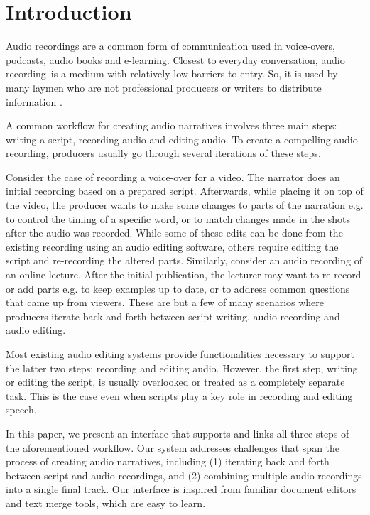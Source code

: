 \section{Introduction}
Audio recordings are a common form of communication used in voice-overs, podcasts, audio books and e-learning. Closest to everyday conversation, audio recording\ is a medium with relatively low barriers to entry. So, it is used by many laymen who are not professional producers or writers to distribute information .

A common workflow for creating audio narratives involves three main steps: writing a script, recording audio and editing audio. To create a compelling audio recording, producers usually go through several iterations of these steps.  

Consider the case of recording a voice-over for a video. The narrator does an initial recording based on a prepared script. Afterwards, while placing it on top of the video, the producer wants to make some changes to parts of the narration e.g. to control the timing of a specific word, or to match changes made in the shots after the audio was recorded. While some of these edits can be done from the existing recording using an audio editing software, others require editing the script and re-recording the altered parts. Similarly, consider an audio recording of an online lecture. After the initial publication, the lecturer may want to re-record or add parts e.g. to keep examples up to date, or to address common questions that came up from viewers. These are but a few of many scenarios where producers iterate back and forth between script writing, audio recording and audio editing.

Most existing audio editing systems provide functionalities necessary
to support the latter two steps: recording and editing audio.
However, the first step, writing or editing the script, is usually overlooked
or treated as a completely separate task. This is the case even
when scripts play a key role in recording and editing speech.
  

In this paper, we present an interface that supports and links all three steps of the aforementioned workflow. Our system addresses challenges that span the process of creating audio narratives, including (1) iterating back and forth between script  and audio recordings, and (2) combining multiple audio recordings into a single final track. Our interface is inspired from familiar document editors and text merge tools, which are easy to learn.

